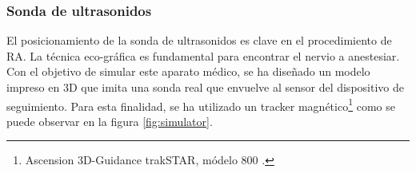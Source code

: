 

\subsubsection{Sonda de ultrasonidos}

El posicionamiento de la sonda de ultrasonidos es clave en el procedimiento de \ac{RA}. La técnica eco-gráfica es fundamental para encontrar el nervio a anestesiar. Con el objetivo de simular este aparato médico, se ha diseñado un modelo impreso en 3D que imita una sonda real que envuelve al sensor del dispositivo de seguimiento. Para esta finalidad, se ha utilizado un \ac{tracker} magnético\footnote{Ascension 3D-Guidance trakSTAR, módelo 800 \cite{Ascension}.} como se puede observar en la figura \ref{fig:simulator}. 


